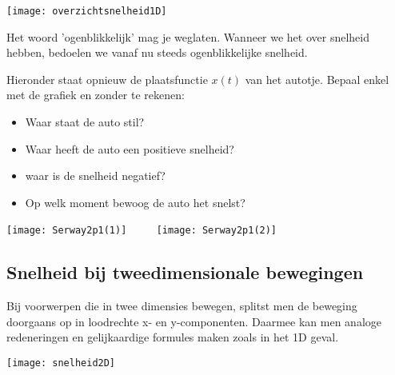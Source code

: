 \documentclass{ximera}
\begin{document}
\begin{image}
\texttt{[image: overzichtsnelheid1D]}

\end{image}

\begin{remark}
	Het woord 'ogenblikkelijk' mag je weglaten. Wanneer we het over snelheid hebben, bedoelen we vanaf nu steeds ogenblikkelijke snelheid.
\end{remark}

\begin{exercise}
Hieronder staat opnieuw de plaatsfunctie \(x(t)\) van het autotje. Bepaal enkel met de grafiek en zonder te rekenen: 
\begin{itemize}
	\item Waar staat de auto stil? 
	\item Waar heeft de auto een positieve snelheid?
	\item waar is de snelheid negatief? 
	\item Op welk moment bewoog de auto het snelst? 
\end{itemize}

\begin{image}
	\texttt{[image: Serway2p1(1)]}
	$\qquad$   %
	\texttt{[image: Serway2p1(2)]}
	\end{image}
	
\end{exercise}

\subsection*{Snelheid bij tweedimensionale bewegingen}

Bij voorwerpen die in twee dimensies bewegen, splitst men de beweging doorgaans op in loodrechte x- en y-componenten. Daarmee kan men analoge redeneringen en gelijkaardige formules maken zoals in het 1D geval.

\begin{image}
\texttt{[image: snelheid2D]}

\end{image}

	
\end{document}
